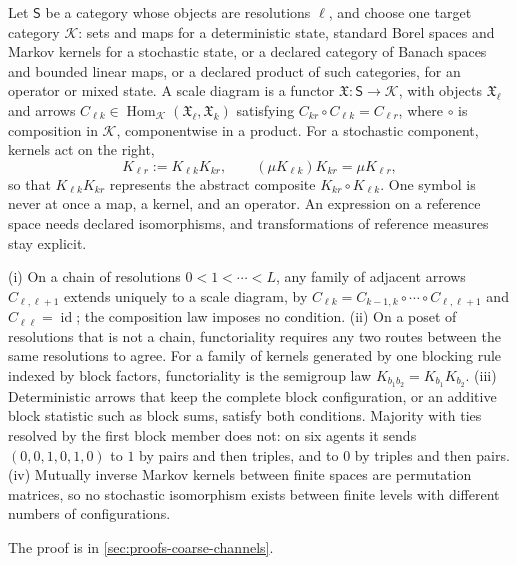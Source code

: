 \label{eq:rg-scale-diagram}
Let $\mathsf S$ be a category whose objects are resolutions $\ell$, and choose one target category
$\mathscr K$: sets and maps for a deterministic state, standard Borel spaces and Markov kernels for
a stochastic state, or a declared category of Banach spaces and bounded linear maps, or a declared
product of such categories, for an operator or mixed state. A scale diagram is a functor
$\mathfrak X:\mathsf S\to\mathscr K$, with objects $\mathfrak X_\ell$ and arrows
$C_{\ell k}\in\operatorname{Hom}_{\mathscr K}(\mathfrak X_\ell,\mathfrak X_k)$ satisfying
$C_{kr}\circ C_{\ell k}=C_{\ell r}$, where $\circ$ is composition in $\mathscr K$, componentwise in
a product. For a stochastic component, kernels act on the right,
\begin{equation}
K_{\ell r}:=K_{\ell k}K_{kr},
\qquad
(\mu K_{\ell k})K_{kr}=\mu K_{\ell r},
\label{eq:rg-right-acting-kernel-composition}
\end{equation}
so that $K_{\ell k}K_{kr}$ represents the abstract composite $K_{kr}\circ K_{\ell k}$. One symbol is
never at once a map, a kernel, and an operator. An expression on a reference space needs declared
isomorphisms, and transformations of reference measures stay explicit.

(i) On a chain of resolutions $0<1<\cdots<L$, any family of adjacent arrows $C_{\ell,\ell+1}$
extends uniquely to a scale diagram, by $C_{\ell k}=C_{k-1,k}\circ\cdots\circ C_{\ell,\ell+1}$ and
$C_{\ell\ell}=\operatorname{id}$; the composition law imposes no condition. (ii) On a poset of
resolutions that is not a chain, functoriality requires any two routes between the same
resolutions to agree. For a family of kernels generated by one blocking rule indexed by block
factors, functoriality is the semigroup law $K_{b_1b_2}=K_{b_1}K_{b_2}$. (iii) Deterministic arrows
that keep the complete block configuration, or an additive block statistic such as block sums,
satisfy both conditions. Majority with ties resolved by the first block member does not: on six
agents it sends $(0,0,1,0,1,0)$ to $1$ by pairs and then triples, and to $0$ by triples and then
pairs. (iv) Mutually inverse Markov kernels between finite spaces are permutation matrices, so no
stochastic isomorphism exists between finite levels with different numbers of configurations.

The proof is in \cref{sec:proofs-coarse-channels}.


